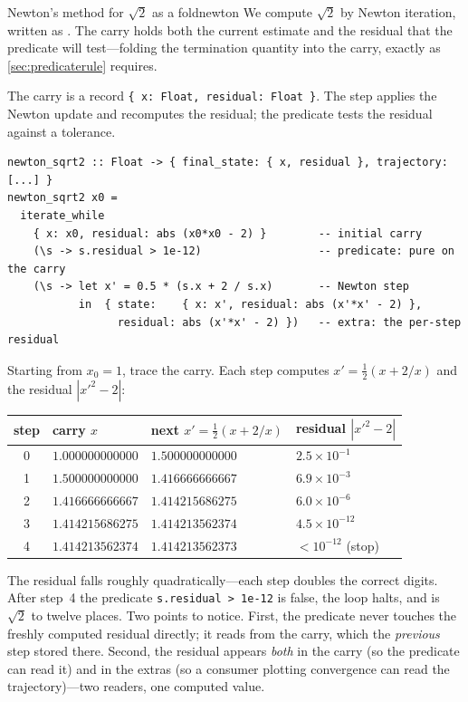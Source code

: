 \begin{workedexample}{Newton's method for $\sqrt{2}$ as a fold}{newton}
We compute $\sqrt 2$ by Newton iteration, written as . The
carry holds both the current estimate and the residual that the predicate will
test---folding the termination quantity into the carry, exactly as
\cref{sec:predicaterule} requires.

The carry is a record \lstinline[style=l4style]|{ x: Float, residual: Float }|.
The step applies the Newton update and recomputes the residual; the predicate
tests the residual against a tolerance.
\begin{lstlisting}[style=l4style]
newton_sqrt2 :: Float -> { final_state: { x, residual }, trajectory: [...] }
newton_sqrt2 x0 =
  iterate_while
    { x: x0, residual: abs (x0*x0 - 2) }        -- initial carry
    (\s -> s.residual > 1e-12)                  -- predicate: pure on the carry
    (\s -> let x' = 0.5 * (s.x + 2 / s.x)       -- Newton step
           in  { state:    { x: x', residual: abs (x'*x' - 2) },
                 residual: abs (x'*x' - 2) })   -- extra: the per-step residual
\end{lstlisting}
Starting from $x_0 = 1$, trace the carry. Each step computes
$x' = \tfrac12(x + 2/x)$ and the residual $|x'^2 - 2|$:
\begin{center}
\setlength{\tabcolsep}{8pt}
\renewcommand{\arraystretch}{1.15}
\begin{tabular}{@{}clll@{}}
\toprule
step & carry $x$ & next $x' = \tfrac12(x + 2/x)$ & residual $|x'^2 - 2|$ \\
\midrule
0 & $1.000000000000$ & $1.500000000000$ & $2.5\times10^{-1}$ \\
1 & $1.500000000000$ & $1.416666666667$ & $6.9\times10^{-3}$ \\
2 & $1.416666666667$ & $1.414215686275$ & $6.0\times10^{-6}$ \\
3 & $1.414215686275$ & $1.414213562374$ & $4.5\times10^{-12}$ \\
4 & $1.414213562374$ & $1.414213562373$ & $<10^{-12}$ \;(stop) \\
\bottomrule
\end{tabular}
\end{center}
The residual falls roughly quadratically---each step doubles the correct digits.
After step~4 the predicate \lstinline[style=l4style]|s.residual > 1e-12| is false,
the loop halts, and  is $\sqrt 2$ to twelve places. Two
points to notice. First, the predicate never touches the freshly computed
residual directly; it reads  from the carry, which the
\emph{previous} step stored there. Second, the residual appears \emph{both} in the
carry (so the predicate can read it) and in the extras (so a consumer plotting
convergence can read the trajectory)---two readers, one computed value.
\end{workedexample}

